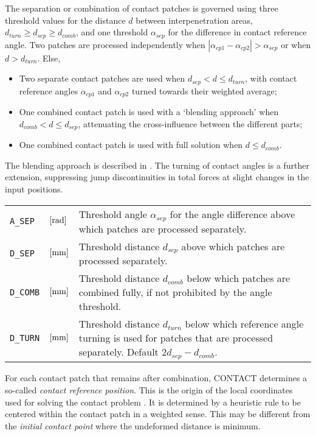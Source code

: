 \documentclass[12pt]{report}
\newenvironment{inputvars}{\vspace{0.4\baselineskip}%

\begin{tabular}{>{\raggedright}p{22mm}p{19mm}p{113mm}}}{
\end{tabular}

}
\newcommand{\inpvar}[3]{{\small\tt #1} & $#2$ & #3 \\[1ex]}
\begin{document}
The separation or combination of contact patches is governed using three
threshold values for the distance $d$ between interpenetration areas,
$d_{turn}\ge d_{sep}\ge d_{comb}$, and one threshold $\alpha_{sep}$ for
the difference in contact reference angle. Two patches are processed
independently when $|\alpha_{cp1}- \alpha_{cp2}| > \alpha_{sep}$ or when
$d > d_{turn}$. Else,
\begin{itemize}
\item Two separate contact patches are used when $d_{sep} < d\le
        d_{turn}$, with contact reference angles $\alpha_{cp1}$ and
        $\alpha_{cp2}$ turned towards their weighted average;
\item One combined contact patch is used with a `blending approach'
        when $d_{comb}< d\le d_{sep}$, attenuating the cross-influence
        between the different parts;
\item One combined contact patch is used with full solution when $d\le
        d_{comb}$.
\end{itemize}
The blending approach is described in \cite{Vollebregt2020b-wrgeom,
Vollebregt2020c-distr-force}. The turning of contact angles is a further
extension, suppressing jump discontinuities in total forces at slight
changes in the input positions.
\begin{inputvars}
\inpvar{A\_SEP}{\bunit{rad}}{Threshold angle $\alpha_{sep}$ for the angle
        difference above which patches are processed separately.}
\inpvar{D\_SEP}{\bunit{mm}}{Threshold distance $d_{sep}$ above which patches
        are processed separately.}
\inpvar{D\_COMB}{\bunit{mm}}{Threshold distance $d_{comb}$ below which
        patches are combined fully, if not prohibited by the angle threshold.}
\inpvar{D\_TURN}{\bunit{mm}}{Threshold distance $d_{turn}$ below which
        reference angle turning is used for patches that are processed
        separately. Default $2 d_{sep}-d_{comb}$.}
\end{inputvars}
For each contact patch that remains after combination, CONTACT determines a
so-called {\em contact reference position\/}. This is the origin of the
local coordinates used for solving the contact problem
\cite{Vollebregt2020b-wrgeom}. It is determined by a heuristic rule to be
centered within the contact patch in a weighted sense. This may be
different from the {\em initial contact point\/} where the undeformed
distance is minimum. 
\end{document}

